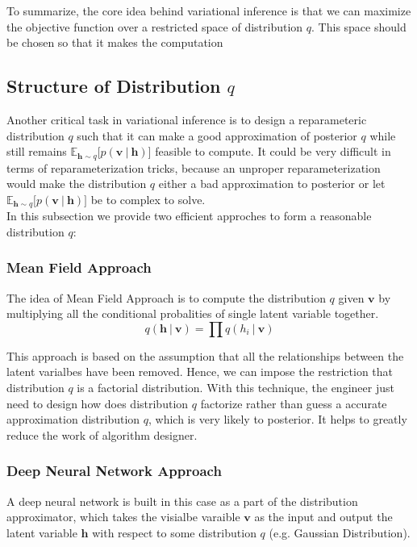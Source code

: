 \documentclass[conference]{IEEEtran}
\begin{document}
To summarize, the core idea behind variational inference is that we can maximize the objective function over a restricted space of distribution $q$. This space should be chosen so that it makes the computation 
\subsection{Structure of Distribution $q$}
Another critical task in variational inference is to design a reparameteric distribution $q$ such that it can make a good approximation of posterior $q$ while still remains $\mathbb{E}_{\boldsymbol{h}\sim q}\bigg[p(\boldsymbol{v}\ |\ \boldsymbol{h})\bigg]$ feasible to compute. It could be very difficult in terms of reparameterization tricks, because an unproper reparameterization would make the distribution $q$ either a bad approximation to posterior or let $\mathbb{E}_{\boldsymbol{h}\sim q}\bigg[p(\boldsymbol{v}\ |\ \boldsymbol{h})\bigg]$ be to complex to solve.\\

In this subsection we provide two efficient approches to form a reasonable distribution $q$:
\subsubsection{Mean Field Approach}
The idea of Mean Field Approach is to compute the distribution $q$ given $\boldsymbol{v}$ by multiplying all the conditional probalities of single latent variable together.
\begin{equation}
	q(\boldsymbol{h}\ |\ \boldsymbol{v}) = \prod q(h_i\ |\ \boldsymbol{v})
\end{equation}

This approach is based on the assumption that all the relationships between the latent varialbes have been removed. Hence, we can impose the restriction that distribution $q$ is a factorial distribution. With this technique, the engineer just need to design how does distribution $q$ factorize rather than guess a accurate approximation distribution $q$, which is very likely to posterior. It helps to greatly reduce the work of algorithm designer.
\subsubsection{Deep Neural Network Approach}
A deep neural network is built in this case as a part of the distribution approximator, which takes the visialbe varaible $\boldsymbol{v}$ as the input and output the latent variable $\boldsymbol{h}$ with respect to some distribution $q$ (e.g. Gaussian Distribution).\\
\end{document}
